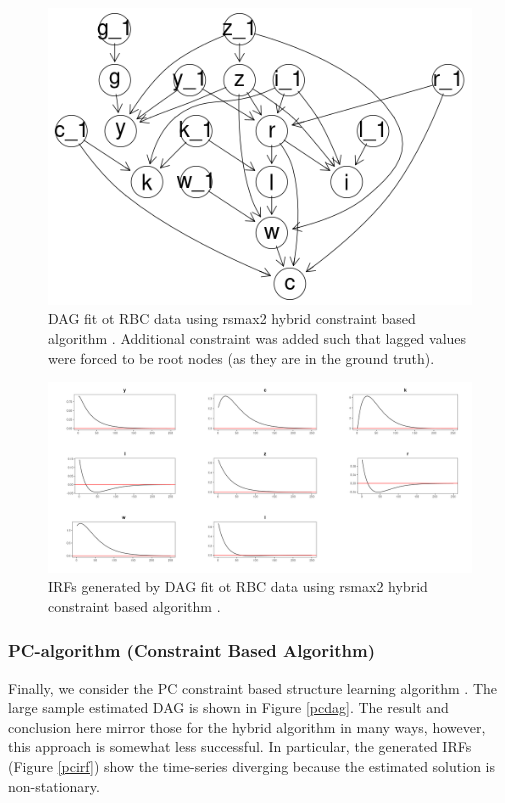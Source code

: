 \documentclass{article}
\begin{document}
\begin{figure}
  \centering  
  \includegraphics[width=0.6\linewidth]{images/rbc_hybrid_dag.png}
  \caption{DAG fit ot RBC data using rsmax2 hybrid constraint based algorithm \parencite{scutari2014multiple}. Additional constraint was added such that lagged values were forced to be root nodes (as they are in the ground truth).}
  \label{hdag}
\end{figure}

\begin{figure}
  \centering  
  \includegraphics[width=0.6\linewidth]{images/rbc_hybrid_irf.png}
  \caption{IRFs generated by DAG fit ot RBC data using rsmax2 hybrid constraint based algorithm \parencite{scutari2014multiple}.}
  \label{hirf}
\end{figure}

\subsubsection{PC-algorithm (Constraint Based Algorithm)} \label{pc}

Finally, we consider the PC constraint based structure learning algorithm \parencite{spirtes2000causation} \parencite{kalisch2007estimating}. The large sample estimated DAG is shown in Figure \ref{pcdag}. The result and conclusion here mirror those for the hybrid algorithm in many ways, however, this approach is somewhat less successful. In particular, the generated IRFs (Figure \ref{pcirf}) show the time-series diverging because the estimated solution is non-stationary.  
\end{document}
